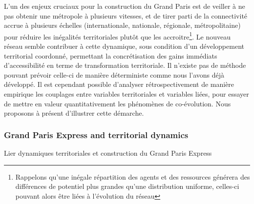 L'un des enjeux cruciaux pour la construction du Grand Paris est de veiller à ne pas obtenir une métropole à plusieurs vitesses, et de tirer parti de la connectivité accrue à plusieurs échelles (internationale, nationale, régionale, métropolitaine) pour réduire les inégalités territoriales plutôt que les accroitre\footnote{Rappelons qu'une inégale répartition des agents et des ressources générera des différences de potentiel plus grandes qu'une distribution uniforme, celles-ci pouvant alors être liées à l'évolution du réseau}. Le nouveau réseau semble contribuer à cette dynamique, sous condition d'un développement territorial coordonné, permettant la concrétisation des gains immédiats d'accessibilité en terme de transformation territoriale. Il n'existe pas de méthode pouvant prévoir celle-ci de manière déterministe comme nous l'avons déjà développé. Il est cependant possible d'analyser rétrospectivement de manière empirique les couplages entre variables territoriales et variables liées, pour essayer de mettre en valeur quantitativement les phénomènes de co-évolution. Nous proposons à présent d'illustrer cette démarche.






\subsubsection{Grand Paris Express and territorial dynamics}{Lier dynamiques territoriales et construction du Grand Paris Express}





